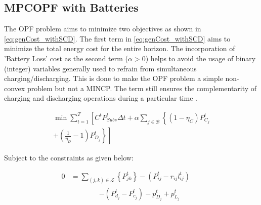 \documentclass[../../outputs/main.tex]{subfiles}
\begin{document}
\subsection{MPCOPF with Batteries}
The OPF problem aims to minimize two objectives 
 as shown in \cref{eq:genCost_withSCD}. The first term in \cref{eq:genCost_withSCD} aims to minimize the total energy cost for the entire horizon. The incorporation of 'Battery Loss' cost as the second term ($\alpha > 0$) helps to avoid the usage of binary (integer) variables generally used to refrain from simultaneous charging/discharging. This is done to make the OPF problem a simple non-convex problem but not a MINCP. The term still ensures the complementarity of charging and discharging operations during a particular time \cite{Nazir2021Sep}.

\begin{equation}
    \begin{split}
        \min \sum_{t = 1}^{T} \left[ C^t P^t_{Subs} \Delta t+ \alpha \sum_{j \in \mathcal{B}} \left\{ (1-\eta_C)P^t_{C_j} \right. \right. \\
        \left. \left. + \left( \frac{1}{\eta_D} - 1 \right) P^t_{D_j} \right\} \right]
    \end{split}
    \label{eq:genCost_withSCD}
\end{equation}


Subject to the constraints  as given below:

\begin{align}
    {0} &= {\sum_{(j, k) \in \mathcal{L}} \left\{P_{jk}^t\right\} 
        - \left(P_{ij}^t - r_{ij}l_{ij}^t\right)} \nonumber && \\[-0.50em]
    {}  &\qquad \qquad {- \left(P_{d_j}^t - P_{c_j}^t\right) - p^t_{D_j} + p^t_{L_j}}
    \label{eq:RealPowerBalanceNodej} &&
\end{align}
\end{document}
